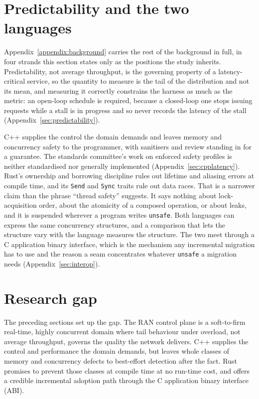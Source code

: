 \documentclass[english,oneside,a4paper,censored,csm,software-track-2020]{HYthesisML}
\begin{document}
\section{Predictability and the two languages}\label{sec:bgbrief}
Appendix~\ref{appendix:background} carries the rest of the background in full, in four strands
this section states only as the positions the study inherits. Predictability, not average
throughput, is the governing property of a latency-critical service, so the quantity to measure
is the tail of the distribution and not its mean, and measuring it correctly
constrains the harness as much as the metric: an open-loop schedule is required, because a
closed-loop one stops issuing requests while a stall is in progress and so never records the
latency of the stall (Appendix~\ref{sec:predictability}).

C++ supplies the control the domain demands and leaves memory and concurrency safety to the
programmer, with sanitisers and review standing in for a guarantee. The standards committee's
work on enforced safety profiles is neither standardised nor generally implemented
(Appendix~\ref{sec:cpplatency}). Rust's ownership and borrowing discipline rules out lifetime and
aliasing errors at compile time, and its \texttt{Send} and \texttt{Sync} traits rule out data
races. That is a narrower claim than the phrase ``thread safety'' suggests. It says nothing about
lock-acquisition order, about the atomicity of a composed operation, or about leaks, and it is
suspended wherever a program writes \texttt{unsafe}. Both languages can express the same
concurrency structures, and a comparison that lets the structure vary with the language measures
the structure. The two meet through a C application binary interface, which is the mechanism any
incremental migration has to use and the reason a seam concentrates whatever \texttt{unsafe} a
migration needs (Appendix~\ref{sec:interop}).

\section{Research gap}\label{sec:gap}
The preceding sections set up the gap. The RAN control plane is a soft-to-firm real-time,
highly concurrent domain where tail behaviour under overload, not average throughput, governs
the quality the network delivers. C++ supplies the control and performance the domain demands,
but leaves whole classes of memory and concurrency defects to best-effort detection after the
fact. Rust promises to prevent those classes at compile time at no run-time cost, and offers a
credible incremental adoption path through the C application binary interface (ABI).
\end{document}
